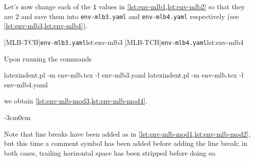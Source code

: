 \documentclass[10pt]{article}
\newenvironment{widepage}{\begin{adjustwidth}{-3cm}{0cm}}{\end{adjustwidth}}
\begin{document}
  \begin{example}
  Let's now change each of the \texttt{1} values in \cref{lst:env-mlb1,lst:env-mlb2} so
  that they are $2$ and save them into \texttt{env-mlb3.yaml} and \texttt{env-mlb4.yaml}
  respectively (see \cref{lst:env-mlb3,lst:env-mlb4}). 

  \begin{cmhtcbraster}
   [MLB-TCB]{\texttt{env-mlb3.yaml}}{lst:env-mlb3}
   [MLB-TCB]{\texttt{env-mlb4.yaml}}{lst:env-mlb4}
  \end{cmhtcbraster}

  Upon running the commands

  \begin{commandshell}
latexindent.pl -m env-mlb.tex -l env-mlb3.yaml
latexindent.pl -m env-mlb.tex -l env-mlb4.yaml
\end{commandshell}

  we obtain \cref{lst:env-mlb-mod3,lst:env-mlb-mod4}.

  \begin{widepage}
   \begin{minipage}{.56\linewidth}
   \end{minipage}
   \hfill
   \begin{minipage}{.43\linewidth}
   \end{minipage}
  \end{widepage}

  Note that line breaks have been added as in \cref{lst:env-mlb-mod1,lst:env-mlb-mod2},
  but this time a comment symbol has been added before adding the line break; in both
  cases, trailing horizontal space has been stripped before doing so.
  \end{example}
\end{document}
